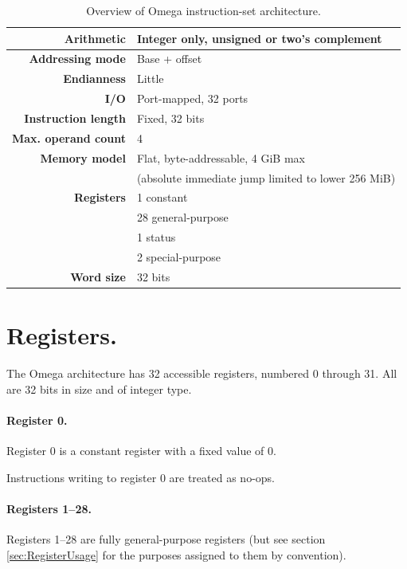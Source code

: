 \documentclass[12pt,english,twoside]{report}
\begin{document}
\begin{table}[H]
\begin{tabular}{r|l}
  \textbf{Arithmetic} & Integer only, unsigned or two's complement\\
  \hline
  \textbf{Addressing mode} & Base + offset\\
  \hline
  \index{Endianness}\textbf{Endianness} & Little\\
  \hline
  \index{I/O}\textbf{I/O} & Port-mapped, 32 ports\\
  \hline
  \index{Instruction length}\textbf{Instruction length} & Fixed, 32 bits\\
  \hline
  \textbf{Max. operand count} & 4\\
  \hline
  \index{Memory model}\textbf{Memory model} & Flat, byte-addressable, 4 GiB max\\
                        & (absolute immediate jump limited to lower 256 MiB)\\
  \hline
  \textbf{Registers} & 1 constant\\
                     & 28 general-purpose\\
                     & 1 status\\
                     & 2 special-purpose\\
  \hline
  \index{Word size}\textbf{Word size} & 32 bits
  
\end{tabular}
\caption{\label{tab:Overview} Overview of Omega instruction-set architecture.}
\end{table}


\section{Registers.}

The Omega architecture has 32 accessible registers,
numbered 0 through 31. All are 32 bits in size and of integer type.

\paragraph{Register 0.}

Register 0 is a constant register with a fixed value of 0.

Instructions writing to register 0 are treated as no-ops.

\paragraph{Registers 1--28.}
Registers 1--28 are fully general-purpose registers (but see section
\ref{sec:RegisterUsage} for the purposes assigned to them by
convention).
\end{document}
